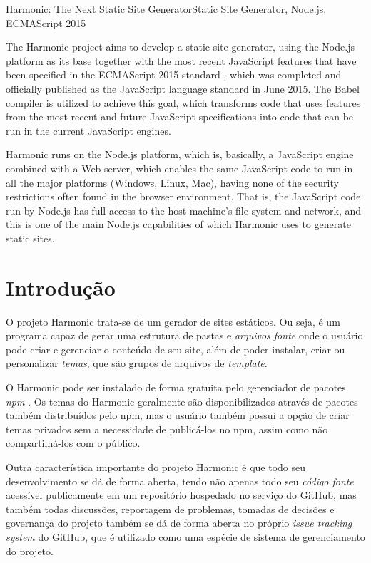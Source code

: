 \documentclass[ppginf, pep]{esinucpel}
\begin{document}
\begin{englishabstract}{Harmonic: The Next Static Site Generator}{Static Site Generator, Node.js, ECMAScript 2015}

The Harmonic project aims to develop a static site generator, using the Node.js platform as its base together with the most recent JavaScript features that have been specified in the ECMAScript 2015 standard \cite{es2015}, which was completed and officially published as the JavaScript language standard in June 2015. The Babel compiler is utilized to achieve this goal, which transforms code that uses features from the most recent and future JavaScript specifications into code that can be run in the current JavaScript engines.

Harmonic runs on the Node.js platform, which is, basically, a JavaScript engine combined with a Web server, which enables the same JavaScript code to run in all the major platforms (Windows, Linux, Mac), having none of the security restrictions often found in the browser environment. That is, the JavaScript code run by Node.js has full access to the host machine's file system and network, and this is one of the main Node.js capabilities of which Harmonic uses to generate static sites.

\end{englishabstract}

\chapter{Introdução}

O projeto Harmonic trata-se de um gerador de sites estáticos. Ou seja, é um programa capaz de gerar uma estrutura de pastas e \emph{arquivos fonte} onde o usuário pode criar e gerenciar o conteúdo de seu site, além de poder instalar, criar ou personalizar \emph{temas}, que são grupos de arquivos de \textit{template}.

O Harmonic pode ser instalado de forma gratuita pelo gerenciador de pacotes \emph{npm} \cite{npm}. Os temas do Harmonic geralmente são disponibilizados através de pacotes também distribuídos pelo npm, mas o usuário também possui a opção de criar temas privados sem a necessidade de publicá-los no npm, assim como não compartilhá-los com o público.

Outra característica importante do projeto Harmonic é que todo seu desenvolvimento se dá de forma aberta, tendo não apenas todo seu \emph{código fonte} acessível publicamente em um repositório hospedado no serviço do \href{https://github.com/}{GitHub}, mas também todas discussões, reportagem de problemas, tomadas de decisões e governança do projeto também se dá de forma aberta no próprio \textit{issue tracking system} do GitHub, que é utilizado como uma espécie de sistema de gerenciamento do projeto.
\end{document}
